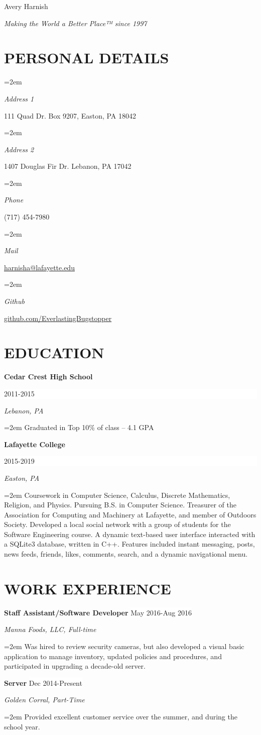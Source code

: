 \documentclass[paper=letter,fontsize=11pt]{scrartcl} %
\newlength{\spacebox}
\newcommand{\sepspace}{\vspace*{1em}}		%
\newcommand{\MyName}[1]{ %
		\Huge \usefont{OT1}{phv}{b}{n} \hfill #1
		\par \normalsize \normalfont}
\newcommand{\MySlogan}[1]{ %
		\large \usefont{OT1}{phv}{m}{n}\hfill \textit{#1}
		\par \normalsize \normalfont}
\newcommand{\NewPart}[1]{\section*{\uppercase{#1}}}
\newcommand{\PersonalEntry}[2]{
		\noindent\hangindent=2em\hangafter=0 %
		\parbox{\spacebox}{        %
		\textit{#1}}		       %
		\hspace{1.5em} #2 \par}    %
\newcommand{\EducationEntry}[4]{
		\noindent \textbf{#1} \hfill      %
		\colorbox{White}{%
			\parbox{6em}{%
			\hfill\color{Black}#2}} \par  %
		\noindent \textit{#3} \par        %
		\noindent\hangindent=2em\hangafter=0 \small #4 %
		\normalsize \par}
\newcommand{\WorkEntry}[4]{				  %
		\noindent \textbf{#1} \hfill      %
		\colorbox{White}{\color{Black}#2} \par  %
		\noindent \textit{#3} \par              %
		\noindent\hangindent=2em\hangafter=0 \small #4 %
		\normalsize \par}
\begin{document}

\MyName{Avery Harnish}
\MySlogan{Making the World a Better Place™ since 1997}


\NewPart{Personal details}{}

\PersonalEntry{Address 1}{111 Quad Dr. Box 9207, Easton, PA 18042}
\PersonalEntry{Address 2}{1407 Douglas Fir Dr. Lebanon, PA 17042}
\PersonalEntry{Phone}{(717) 454-7980}
\PersonalEntry{Mail}{\url{harnisha@lafayette.edu}}
\PersonalEntry{Github}{\url{github.com/EverlastingBugstopper}}

\NewPart{Education}{}

\EducationEntry{Cedar Crest High School}{2011-2015}{Lebanon, PA}{Graduated in Top 10\% of class -- 4.1 GPA}
\sepspace

\EducationEntry{Lafayette College}{2015-2019}{Easton, PA}{Coursework in Computer Science, Calculus, Discrete Mathematics, Religion, and Physics. Pursuing B.S. in Computer Science. Treasurer of the Association for Computing and Machinery at Lafayette, and member of Outdoors Society. Developed a local social network with a group of students for the Software Engineering course. A dynamic text-based user interface interacted with a SQLite3 database, written in C++. Features included instant messaging, posts, news feeds, friends, likes, comments, search, and a dynamic navigational menu.}

\NewPart{Work experience}{}

\WorkEntry{Staff Assistant/Software Developer}{May 2016-Aug 2016}{Manna Foods, LLC, Full-time}{Was hired to review security cameras, but also developed a visual basic application to manage inventory, updated policies and procedures, and participated in upgrading a decade-old server.}
\sepspace

\WorkEntry{Server}{Dec 2014-Present}{Golden Corral, Part-Time}{Provided excellent customer service over the summer, and during the school year.}
\sepspace
\end{document}
